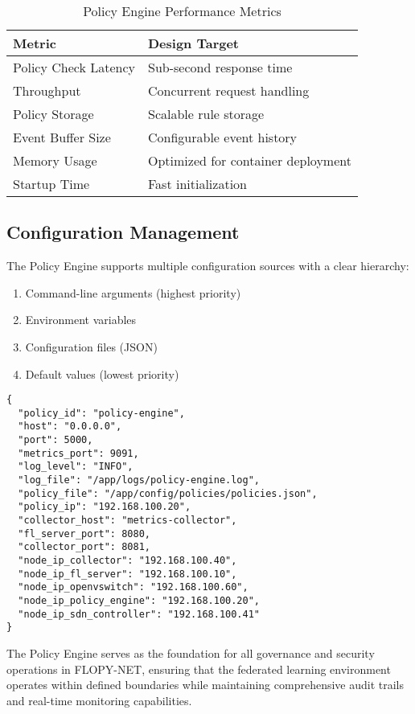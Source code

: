 \begin{table}[H]
\centering
\caption{Policy Engine Performance Metrics}
\label{tab:policy-performance}
\begin{tabular}{@{}ll@{}}
\toprule
\textbf{Metric} & \textbf{Design Target} \\
\midrule
Policy Check Latency & Sub-second response time \\
Throughput & Concurrent request handling \\
Policy Storage & Scalable rule storage \\
Event Buffer Size & Configurable event history \\
Memory Usage & Optimized for container deployment \\
Startup Time & Fast initialization \\
\bottomrule
\end{tabular}
\end{table}

\subsection{Configuration Management}

The Policy Engine supports multiple configuration sources with a clear hierarchy:

\begin{enumerate}
    \item Command-line arguments (highest priority)
    \item Environment variables
    \item Configuration files (JSON)
    \item Default values (lowest priority)
\end{enumerate}

\begin{lstlisting}[style=jsoncode, caption=Policy Engine Configuration]
{
  "policy_id": "policy-engine",
  "host": "0.0.0.0",
  "port": 5000,
  "metrics_port": 9091,
  "log_level": "INFO",
  "log_file": "/app/logs/policy-engine.log",
  "policy_file": "/app/config/policies/policies.json",
  "policy_ip": "192.168.100.20",
  "collector_host": "metrics-collector",
  "fl_server_port": 8080,
  "collector_port": 8081,
  "node_ip_collector": "192.168.100.40",
  "node_ip_fl_server": "192.168.100.10",
  "node_ip_openvswitch": "192.168.100.60",
  "node_ip_policy_engine": "192.168.100.20",
  "node_ip_sdn_controller": "192.168.100.41"
}
\end{lstlisting}

The Policy Engine serves as the foundation for all governance and security operations in FLOPY-NET, ensuring that the federated learning environment operates within defined boundaries while maintaining comprehensive audit trails and real-time monitoring capabilities.
